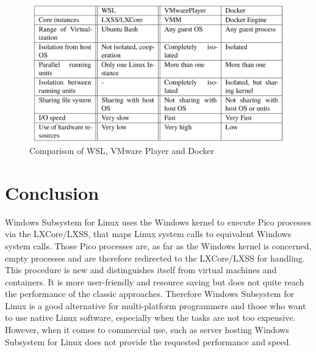 \documentclass[utf8,biblatex, ngerman, english]{lni}
\begin{document}
\clearpage

\begin{figure}
 \hspace{-3.8mm}
  \includegraphics[width=1.048\textwidth]{Tabelle.PNG}
  \caption{Comparison of WSL, VMware Player and Docker}
  \label{tab:demo} 
\end{figure}

\section{Conclusion}
Windows Subsystem for Linux uses the Windows kernel to execute Pico processes via the LXCore/LXSS, that maps Linux system calls to equivalent Windows system calls. Those Pico processes are, as far as the Windows kernel is concerned, empty processes and are therefore redirected to the LXCore/LXSS for handling. This procedure is new and distinguishes itself from virtual machines and containers. It is more user-friendly and resource saving but does not quite reach the performance of the classic approaches. Therefore Windows Subsystem for Linux is a good alternative for multi-platform programmers and those who want to use native Linux software, especially when the tasks are not too expensive. However, when it comes to commercial use, such as server hosting Windows Subsystem for Linux does not provide the requested performance and speed.

\newpage
{}
\printbibliography
\end{document}
